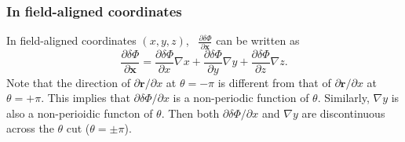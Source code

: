 \documentclass{article}
\begin{document}
\subsubsection{In field-aligned coordinates}

In field-aligned coordinates $(x, y, z)$, \ $\frac{\partial \delta
\Phi}{\partial \mathbf{x}}$ can be written as
\begin{equation}
  \label{23-11-29-p1} \frac{\partial \delta \Phi}{\partial \mathbf{x}} =
  \frac{\partial \delta \Phi}{\partial x} \nabla x + \frac{\partial \delta
  \Phi}{\partial y} \nabla y + \frac{\partial \delta \Phi}{\partial z} \nabla
  z.
\end{equation}
Note that the direction of $\partial \mathbf{r}/ \partial x$ at $\theta = -
\pi$ is different from that of $\partial \mathbf{r}/ \partial x$ at $\theta =
+ \pi$. This implies that $\partial \delta \Phi / \partial x$ is a
non-periodic function of $\theta$. Similarly, $\nabla y$ is also a
non-perioidic functon of $\theta$. Then both $\partial \delta \Phi / \partial
x$ and $\nabla y$ are discontinuous across the $\theta$ cut ($\theta = \pm
\pi$).
\end{document}

